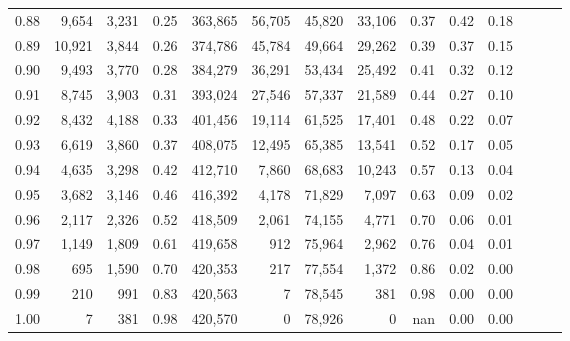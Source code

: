 \begin{tabular}{rrrrrrrrrrrrrr}
0.88 &   9,654 &  3,231 &  0.25 &  363,865 &   56,705 &  45,820 &  33,106 &  0.37 &  0.42 &      0.18 \\
0.89 &  10,921 &  3,844 &  0.26 &  374,786 &   45,784 &  49,664 &  29,262 &  0.39 &  0.37 &      0.15 \\
0.90 &   9,493 &  3,770 &  0.28 &  384,279 &   36,291 &  53,434 &  25,492 &  0.41 &  0.32 &      0.12 \\
0.91 &   8,745 &  3,903 &  0.31 &  393,024 &   27,546 &  57,337 &  21,589 &  0.44 &  0.27 &      0.10 \\
0.92 &   8,432 &  4,188 &  0.33 &  401,456 &   19,114 &  61,525 &  17,401 &  0.48 &  0.22 &      0.07 \\
0.93 &   6,619 &  3,860 &  0.37 &  408,075 &   12,495 &  65,385 &  13,541 &  0.52 &  0.17 &      0.05 \\
0.94 &   4,635 &  3,298 &  0.42 &  412,710 &    7,860 &  68,683 &  10,243 &  0.57 &  0.13 &      0.04 \\
0.95 &   3,682 &  3,146 &  0.46 &  416,392 &    4,178 &  71,829 &   7,097 &  0.63 &  0.09 &      0.02 \\
0.96 &   2,117 &  2,326 &  0.52 &  418,509 &    2,061 &  74,155 &   4,771 &  0.70 &  0.06 &      0.01 \\
0.97 &   1,149 &  1,809 &  0.61 &  419,658 &      912 &  75,964 &   2,962 &  0.76 &  0.04 &      0.01 \\
0.98 &     695 &  1,590 &  0.70 &  420,353 &      217 &  77,554 &   1,372 &  0.86 &  0.02 &      0.00 \\
0.99 &     210 &    991 &  0.83 &  420,563 &        7 &  78,545 &     381 &  0.98 &  0.00 &      0.00 \\
1.00 &       7 &    381 &  0.98 &  420,570 &        0 &  78,926 &       0 &   nan &  0.00 &      0.00 \\
\bottomrule
\end{tabular}
